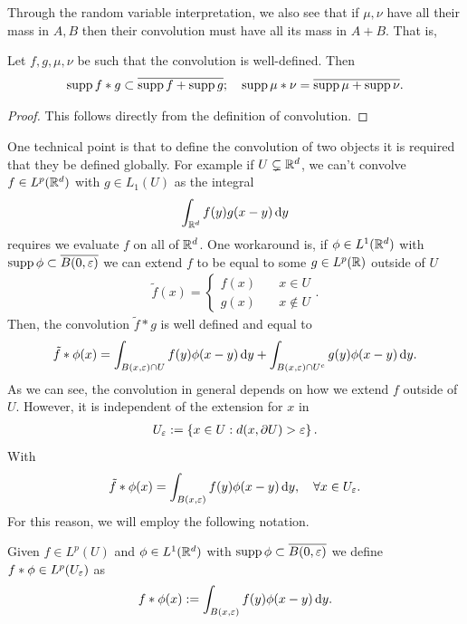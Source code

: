 \documentclass[
    a4paper,
    DIV=14,
    abstract=true,
    numbers=noenddot
]{scrartcl}
\begin{document}
Through the random variable interpretation, we also see that if $\mu,\nu$ have all their mass in $A, B$ then their convolution must have all its mass in  $A+B$. That is,
\begin{lemma}\label{Support}
	Let $f,g,\mu,\nu$ be such that the convolution is well-defined. Then
	\begin{align*}
		\operatorname{supp}{f*g}\subset \overline{\operatorname{supp}{f}+\operatorname{supp}{g}}; \quad \operatorname{supp}{\mu*\nu }=\overline{\operatorname{supp}{\mu }+\operatorname{supp}{\nu}}.
	\end{align*}
\end{lemma}
\begin{proof}
	This follows directly from the definition of convolution.
\end{proof}
One technical point is that to define the convolution of two objects it is required that they be defined globally. For example if $U \subsetneq \mathbb{R}^d $, we can't convolve $f \in L^p(\mathbb{R}^d)$ with $g \in L_1(U)$ as the integral
\begin{align*}
	\int_{\mathbb{R}^d}f(y)g(x-y) \,\mathrm{d} y
\end{align*}
requires we evaluate $f$ on all of  $\mathbb{R}^d$. One workaround is, if $\phi\in L^1(\mathbb{R}^d)$ with $\operatorname{supp}{\phi}\subset  \overline{B(0,\varepsilon ) }$ we can extend $f$ to be equal to  some $ g \in L^p(\mathbb{R})$ outside of $U$
\begin{align*}
	\tilde{f}(x)=\begin{cases}
		             f(x) \quad & x \in U     \\
		             g(x) \quad & x \not\in U
	             \end{cases}.
\end{align*}
Then, the convolution $\tilde{f}*g$ is well defined and equal to
\begin{align*}
	\tilde{f}*\phi(x) = \int_{B(x,\varepsilon )\cap U} f(y)\phi(x-y) \,\mathrm{d} y+\int_{B(x,\varepsilon )\cap U^c} g(y)\phi(x-y) \,\mathrm{d} y .
\end{align*}
As we can see, the convolution in general depends on how we extend $f$ outside of $U$. However, it is independent of the extension for $x$ in
\begin{align*}
	U_\varepsilon :=\left\{x \in  U : d(x,\partial U)> \varepsilon \right\}.
\end{align*}
With
\begin{align*}
	\tilde{f}*\phi(x) = \int_{B(x,\varepsilon )} f(y)\phi(x-y) \,\mathrm{d} y , \quad\forall x \in  U_\varepsilon   .
\end{align*}
For this reason, we will employ the following notation.
\begin{definition}\label{Convolution support}
	Given $f \in L^p(U)$ and $\phi\in L^1(\mathbb{R}^d)$ with $\operatorname{supp}{\phi}\subset  \overline{B(0,\varepsilon ) }$ we define $f*\phi \in L^p(U_\varepsilon )$ as
	\begin{align*}
		f*\phi(x):= \int_{B(x,\varepsilon )}f(y)\phi(x-y) \,\mathrm{d} y .
	\end{align*}
\end{definition}
\end{document}
